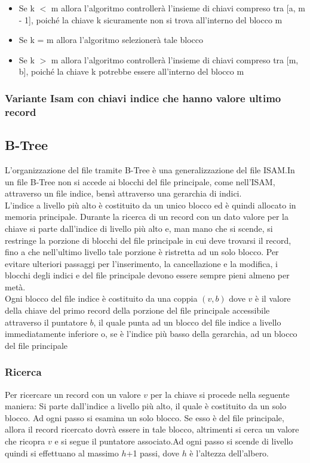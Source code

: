 \documentclass{article}
\begin{document}
\begin{itemize}
  \item Se k $<$ m allora l'algoritmo controllerà l'insieme di chiavi compreso tra [a, m - 1], poiché la chiave k sicuramente non si trova all'interno del blocco m
  \item Se k = m allora l'algoritmo selezionerà tale blocco
  \item Se k $>$ m allora l'algoritmo controllerà l'insieme di chiavi compreso tra [m, b], poiché la chiave k potrebbe essere all'interno del blocco m
\end{itemize}

\subsubsection{Variante Isam con chiavi indice che hanno valore ultimo record}


\pagebreak
\subsection{B-Tree}
L'organizzazione del file tramite B-Tree è una generalizzazione del file ISAM.In un file B-Tree non si accede ai blocchi del file principale, come nell'ISAM, attraverso un file indice, bensì attraverso una gerarchia di indici. \\

L'indice a livello più alto è costituito da un unico blocco ed è quindi allocato in memoria principale. Durante la ricerca di un record con un dato valore per la chiave si parte dall'indice di livello più alto e, man mano che si scende, si restringe la porzione di blocchi del file principale in cui deve trovarsi il record, fino a che nell'ultimo livello tale porzione è ristretta ad un solo blocco. Per evitare ulteriori passaggi per l'inserimento, la cancellazione e la modifica, i blocchi degli indici e del file principale devono essere sempre pieni almeno per metà.\\

Ogni blocco del file indice è costituito da una coppia $(v,b)$ dove $v$ è il valore della chiave del primo record della porzione del file principale accessibile attraverso il puntatore $b$, il quale punta ad un blocco del file indice a livello immediatamente inferiore o, se è l'indice più basso della gerarchia, ad un blocco del file principale

\subsubsection{Ricerca}
Per ricercare un record con un valore $v$ per la chiave si procede nella seguente maniera: Si parte dall'indice a livello più alto, il quale è costituito da un solo blocco. Ad ogni passo si esamina un solo blocco. Se esso è del file principale, allora il record ricercato dovrà essere in tale blocco, altrimenti si cerca un valore che ricopra $v$ e si segue il puntatore associato.Ad ogni passo si scende di livello quindi si effettuano al massimo $h$+1 passi, dove $h$ è l'altezza dell'albero.
\end{document}
